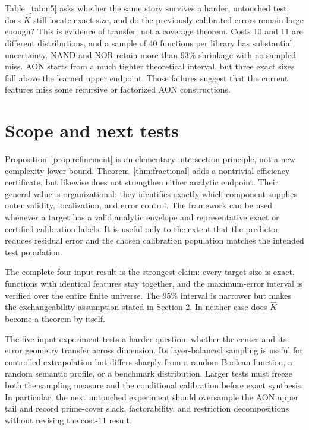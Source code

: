 \documentclass[10pt]{article}
\begin{document}
Table~\ref{tab:n5} asks whether the same story survives a harder, untouched
test: does $\widehat K$ still locate exact size, and do the previously
calibrated errors remain large enough?  This is evidence of transfer, not a
coverage theorem.  Costs 10 and 11 are different distributions, and a sample
of 40 functions per library has substantial uncertainty.  NAND and NOR retain
more than 93\% shrinkage with no sampled miss.  AON starts from a much tighter
theoretical interval, but three exact sizes fall above the learned upper
endpoint.  Those failures suggest that the current features miss some
recursive or factorized AON constructions.

\FloatBarrier
\section{Scope and next tests}

Proposition~\ref{prop:refinement} is an elementary intersection principle,
not a new complexity lower bound.  Theorem~\ref{thm:fractional} adds a
nontrivial efficiency certificate, but likewise does not strengthen either
analytic endpoint.  Their general value is organizational: they
identifies exactly which component supplies outer validity, localization, and
error control.  The framework can be used whenever a target has a valid
analytic envelope and representative exact or certified calibration labels.
It is useful only to the extent that the predictor reduces residual error and
the chosen calibration population matches the intended test population.

The complete four-input result is the strongest claim: every target size is
exact, functions with identical features stay together, and the
maximum-error interval is verified over the entire finite universe.  The 95\%
interval is narrower but makes the exchangeability assumption stated in
Section 2.  In neither case does $\widehat K$ become a theorem by itself.

The five-input experiment tests a harder question: whether the center and its
error geometry transfer across dimension.  Its layer-balanced sampling is
useful for controlled extrapolation but differs sharply from a random Boolean
function, a random semantic profile, or a benchmark distribution.  Larger
tests must freeze both the sampling measure and the conditional calibration
before exact synthesis.  In particular, the next untouched experiment should
oversample the AON upper tail and record prime-cover slack, factorability, and
restriction decompositions without revising the cost-11 result.
\end{document}
